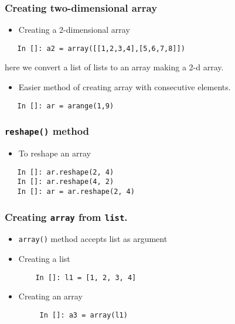 \documentclass[presentation]{beamer}
\begin{document}
\begin{frame}[fragile]
\frametitle{Creating two-dimensional array}
\label{sec-4}

\begin{itemize}
\item Creating a 2-dimensional array
\end{itemize}

\begin{verbatim}
   In []: a2 = array([[1,2,3,4],[5,6,7,8]])
\end{verbatim}

  here we convert a list of lists to an array making a 2-d array.
\begin{itemize}
\item Easier method of creating array with consecutive elements.
\end{itemize}

\begin{verbatim}
   In []: ar = arange(1,9)
\end{verbatim}
\end{frame}
\begin{frame}[fragile]
\frametitle{\texttt{reshape()} method}
\label{sec-5}

\begin{itemize}
\item To reshape an array
\end{itemize}

\begin{verbatim}
   In []: ar.reshape(2, 4)
   In []: ar.reshape(4, 2)
   In []: ar = ar.reshape(2, 4)
\end{verbatim}
\end{frame}
\begin{frame}[fragile]
\frametitle{Creating \texttt{array} from \texttt{list}.}
\label{sec-6}

\begin{itemize}
\item \texttt{array()} method accepts list as argument
\item Creating a list
\begin{verbatim}
    In []: l1 = [1, 2, 3, 4]
\end{verbatim}

\item Creating an array
\begin{verbatim}
     In []: a3 = array(l1)
\end{verbatim}

\end{itemize}
\end{frame}
\end{document}
